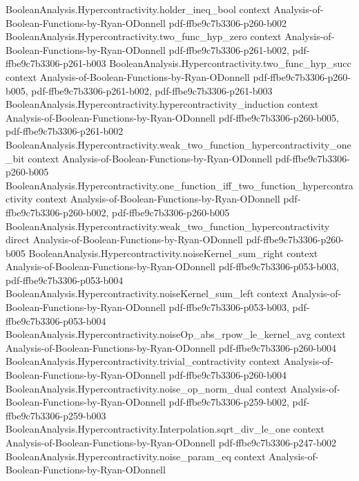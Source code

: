 \begin{lemma}
  {BooleanAnalysis.Hypercontractivity.holder_ineq_bool}
  {context}
  {Analysis-of-Boolean-Functions-by-Ryan-ODonnell}
  {pdf-ffbe9c7b3306-p260-b002}
\proofstep
  {BooleanAnalysis.Hypercontractivity.two_func_hyp_zero}
  {context}
  {Analysis-of-Boolean-Functions-by-Ryan-ODonnell}
  {pdf-ffbe9c7b3306-p261-b002,
    pdf-ffbe9c7b3306-p261-b003}
\proofstep
  {BooleanAnalysis.Hypercontractivity.two_func_hyp_succ}
  {context}
  {Analysis-of-Boolean-Functions-by-Ryan-ODonnell}
  {pdf-ffbe9c7b3306-p260-b005,
    pdf-ffbe9c7b3306-p261-b002,
    pdf-ffbe9c7b3306-p261-b003}
\proofstep
  {BooleanAnalysis.Hypercontractivity.hypercontractivity_induction}
  {context}
  {Analysis-of-Boolean-Functions-by-Ryan-ODonnell}
  {pdf-ffbe9c7b3306-p260-b005,
    pdf-ffbe9c7b3306-p261-b002}
\proofstep
  {BooleanAnalysis.Hypercontractivity.weak_two_function_hypercontractivity_one_bit}
  {context}
  {Analysis-of-Boolean-Functions-by-Ryan-ODonnell}
  {pdf-ffbe9c7b3306-p260-b005}
\proofstep
  {BooleanAnalysis.Hypercontractivity.one_function_iff_two_function_hypercontractivity}
  {context}
  {Analysis-of-Boolean-Functions-by-Ryan-ODonnell}
  {pdf-ffbe9c7b3306-p260-b002,
    pdf-ffbe9c7b3306-p260-b005}
\proofstep
  {BooleanAnalysis.Hypercontractivity.weak_two_function_hypercontractivity}
  {direct}
  {Analysis-of-Boolean-Functions-by-Ryan-ODonnell}
  {pdf-ffbe9c7b3306-p260-b005}
\proofstep
  {BooleanAnalysis.Hypercontractivity.noiseKernel_sum_right}
  {context}
  {Analysis-of-Boolean-Functions-by-Ryan-ODonnell}
  {pdf-ffbe9c7b3306-p053-b003,
    pdf-ffbe9c7b3306-p053-b004}
\proofstep
  {BooleanAnalysis.Hypercontractivity.noiseKernel_sum_left}
  {context}
  {Analysis-of-Boolean-Functions-by-Ryan-ODonnell}
  {pdf-ffbe9c7b3306-p053-b003,
    pdf-ffbe9c7b3306-p053-b004}
\proofstep
  {BooleanAnalysis.Hypercontractivity.noiseOp_abs_rpow_le_kernel_avg}
  {context}
  {Analysis-of-Boolean-Functions-by-Ryan-ODonnell}
  {pdf-ffbe9c7b3306-p260-b004}
\proofstep
  {BooleanAnalysis.Hypercontractivity.trivial_contractivity}
  {context}
  {Analysis-of-Boolean-Functions-by-Ryan-ODonnell}
  {pdf-ffbe9c7b3306-p260-b004}
\proofstep
  {BooleanAnalysis.Hypercontractivity.noise_op_norm_dual}
  {context}
  {Analysis-of-Boolean-Functions-by-Ryan-ODonnell}
  {pdf-ffbe9c7b3306-p259-b002,
    pdf-ffbe9c7b3306-p259-b003}
\proofstep
  {BooleanAnalysis.Hypercontractivity.Interpolation.sqrt_div_le_one}
  {context}
  {Analysis-of-Boolean-Functions-by-Ryan-ODonnell}
  {pdf-ffbe9c7b3306-p247-b002}
\proofstep
  {BooleanAnalysis.Hypercontractivity.noise_param_eq}
  {context}
  {Analysis-of-Boolean-Functions-by-Ryan-ODonnell}

\end{lemma}
